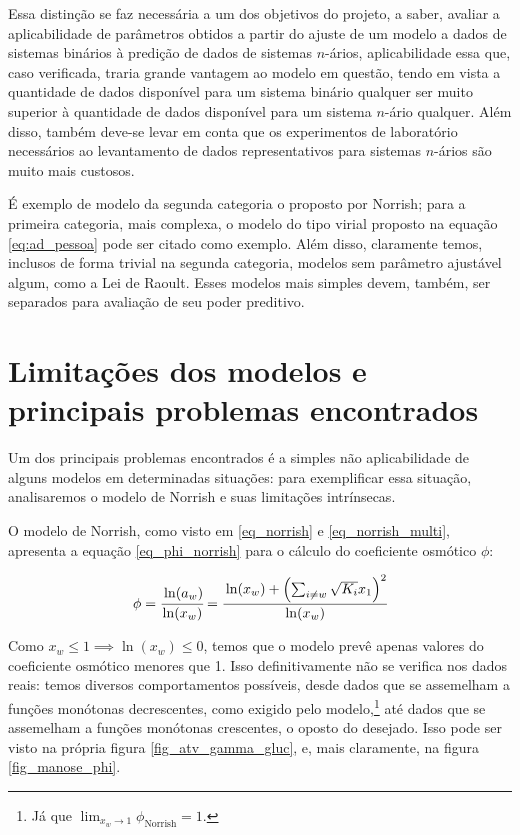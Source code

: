 \documentclass[
	12pt,				%
	openright,
	twoside,
	a4paper,			%
	english,			%
	french,				%
	spanish,			%
	brazil				%
	]{abntex2}
\begin{document}
Essa distinção se faz necessária a um dos objetivos do projeto, a saber, avaliar
a aplicabilidade de parâmetros obtidos a partir do ajuste de um modelo a dados
de sistemas binários à predição de dados de sistemas $n$-ários, aplicabilidade
essa que, caso verificada, traria grande vantagem ao modelo em questão, tendo em
vista a quantidade de dados disponível para um sistema binário qualquer
ser muito superior à quantidade de dados disponível para um sistema $n$-ário
qualquer. Além disso, também deve-se levar em conta que os experimentos de
laboratório necessários ao levantamento de dados representativos para sistemas
$n$-ários são muito mais custosos.

É exemplo de modelo da segunda categoria o proposto por Norrish; para a
primeira categoria, mais complexa, o modelo do tipo virial proposto na equação
\ref{eq:ad_pessoa} pode ser citado como exemplo. Além disso, claramente temos,
inclusos de forma trivial na segunda categoria, modelos sem parâmetro ajustável
algum, como a Lei de Raoult. Esses modelos mais simples devem, também, ser
separados para avaliação de seu poder preditivo.

\section{Limitações dos modelos e principais problemas encontrados}

Um dos principais problemas encontrados é a simples não aplicabilidade de
alguns modelos em determinadas situações: para exemplificar essa situação,
analisaremos o modelo de Norrish e suas limitações intrínsecas.

O modelo de Norrish, como visto em \ref{eq_norrish} e \ref{eq_norrish_multi},
apresenta a equação \ref{eq_phi_norrish} para o cálculo do coeficiente
osmótico $\phi$:

\begin{equation}
	\label{eq_phi_norrish}
	\phi = \cfrac{\ln(a_w)}{\ln(x_w)} = \cfrac{\ln(x_w) + \left(\sum_{ i\neq w}
	\sqrt{K_i}x_1\right)^2}{\ln(x_w)}
\end{equation}

Como $x_w \le 1 \implies \ln(x_w) \le 0$, temos que o modelo prevê apenas
valores do coeficiente osmótico menores que 1. Isso definitivamente não se
verifica nos dados reais: temos diversos comportamentos possíveis, desde
dados que se assemelham a funções monótonas decrescentes, como exigido pelo
modelo,\footnote{%
	Já que $\lim_{x_w \to 1}\phi_\text{Norrish} = 1$.
} até dados que se assemelham a funções monótonas crescentes, o oposto do
desejado. Isso pode ser visto na própria figura \ref{fig_atv_gamma_gluc}, e,
mais claramente, na figura \ref{fig_manose_phi}.
\end{document}

